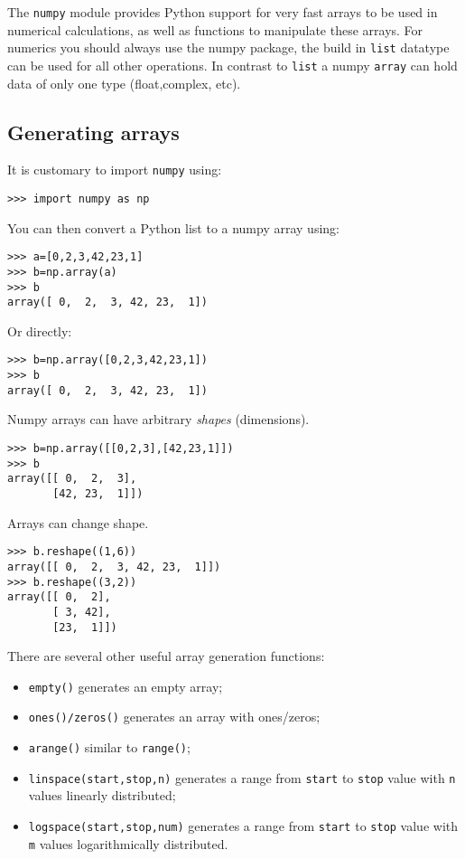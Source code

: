 \documentclass[10pt,a4paper]{article}
\begin{document}
The \verb|numpy| module provides Python support for very fast arrays to be used in numerical calculations, as well as functions to manipulate these arrays.
For numerics you should always use the numpy package, the build in \verb|list| datatype can be used for all other operations.
In contrast to \verb|list| a numpy \verb|array| can hold data of only one type (float,complex, etc).

\subsection{Generating arrays}
It is customary to import \verb|numpy| using:
\begin{lstlisting}
>>> import numpy as np
\end{lstlisting}
You can then convert a Python list to a numpy array using:
\begin{lstlisting}
>>> a=[0,2,3,42,23,1]
>>> b=np.array(a)
>>> b
array([ 0,  2,  3, 42, 23,  1])
\end{lstlisting}
Or directly:
\begin{lstlisting}
>>> b=np.array([0,2,3,42,23,1])
>>> b
array([ 0,  2,  3, 42, 23,  1])
\end{lstlisting}

Numpy arrays can have arbitrary \emph{shapes} (dimensions).
\begin{lstlisting}
>>> b=np.array([[0,2,3],[42,23,1]])
>>> b
array([[ 0,  2,  3],
       [42, 23,  1]])
\end{lstlisting}
Arrays can change shape.
\begin{lstlisting}
>>> b.reshape((1,6))
array([[ 0,  2,  3, 42, 23,  1]])
>>> b.reshape((3,2))
array([[ 0,  2],
       [ 3, 42],
       [23,  1]])
\end{lstlisting}
There are several other useful array generation functions:
\begin{itemize}
\item \verb|empty()| generates an empty array;
\item \verb|ones()/zeros()| generates an array with ones/zeros;
\item \verb|arange()| similar to \verb|range()|;
\item \verb|linspace(start,stop,n)| generates a range from \verb|start| to \verb|stop| value with \verb|n| values linearly distributed;
\item \verb|logspace(start,stop,num)| generates a range from \verb|start| to \verb|stop| value with \verb|m| values logarithmically distributed.
\end{itemize}
\end{document}
